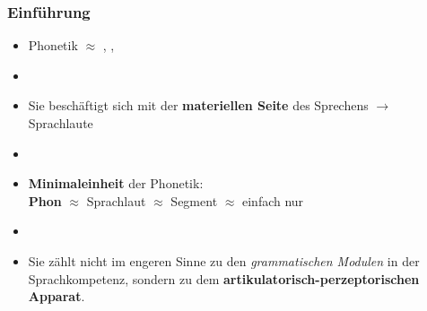 


\begin{frame}
\frametitle{Einführung}

	\begin{itemize}
		\item Phonetik $\approx$ , , 
		\item[]
		\item Sie beschäftigt sich mit der \textbf{materiellen Seite} des Sprechens $\rightarrow$ Sprachlaute 
		\item[]
		\item \textbf{Minimaleinheit} der Phonetik:\\
                      \textbf{Phon} $\approx$ Sprachlaut $\approx$ Segment $\approx$ einfach nur 
		\item[]
		\item Sie zählt nicht im engeren Sinne zu den \textit{grammatischen Modulen} in der Sprachkompetenz, sondern zu dem \textbf{artikulatorisch-perzeptorischen Apparat}.
	\end{itemize}
	
\end{frame}




